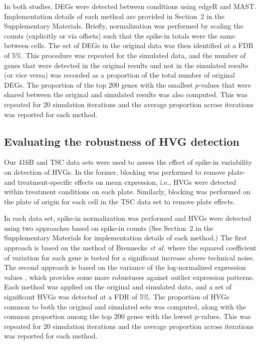 \documentclass{article}
\newcommand{\suppsecsim}{2}
\begin{document}
In both studies, DEGs were detected between conditions using edgeR and MAST.
Implementation details of each method are provided in Section~\suppsecsim{} in the Supplementary Materials. 
Briefly, normalization was performed by scaling the counts (explicitly or via offsets) such that the spike-in totals were the same between cells.
The set of DEGs in the original data was then identified at a FDR of 5\%.
This procedure was repeated for the simulated data, and the number of genes that were detected in the original results and not in the simulated results (or vice versa) was recorded as a proportion of the total number of original DEGs.
The proportion of the top 200 genes with the smallest $p$-values that were shared between the original and simulated results was also computed.
This was repeated for 20 simulation iterations and the average proportion across iterations was reported for each method.

\subsection{Evaluating the robustness of HVG detection}
Our 416B and TSC data sets were used to assess the effect of spike-in variability on detection of HVGs.
In the former, blocking was performed to remove plate- and treatment-specific effects on mean expression, i.e., HVGs were detected within treatment conditions on each plate.
Similarly, blocking was performed on the plate of origin for each cell in the TSC data set to remove plate effects.

In each data set, spike-in normalization was performed and HVGs were detected using two approaches based on spike-in counts 
(See Section~\suppsecsim{} in the Supplementary Materials for implementation details of each method.)
The first approach is based on the method of Brennecke \textit{et al.} \cite{brennecke2013accounting} where the squared coefficient of variation for each gene is tested for a significant increase above technical noise.
The second approach is based on the variance of the log-normalized expression values \cite{lun2016stepbystep}, which provides some more robustness against outlier expression patterns.
Each method was applied on the original and simulated data, and a set of significant HVGs was detected at a FDR of 5\%.
The proportion of HVGs common to both the original and simulated sets was computed, along with the common proportion among the top 200 genes with the lowest $p$-values.
This was repeated for 20 simulation iterations and the average proportion across iterations was reported for each method.
\end{document}
